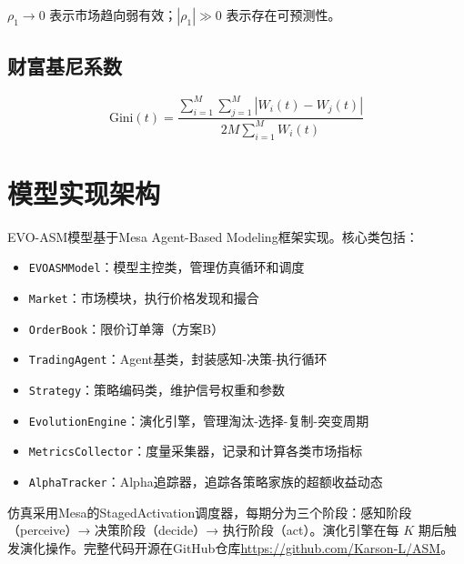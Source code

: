 $\rho_1 \to 0$ 表示市场趋向弱有效；$|\rho_1| \gg 0$ 表示存在可预测性。

\subsection{财富基尼系数}

\begin{equation}
\text{Gini}(t) = \frac{\sum_{i=1}^{M} \sum_{j=1}^{M} |W_i(t) - W_j(t)|}{2M \sum_{i=1}^{M} W_i(t)}
\label{eq:gini}
\end{equation}

\section{模型实现架构}

EVO-ASM模型基于Mesa Agent-Based Modeling框架实现。核心类包括：

\begin{itemize}
    \item \texttt{EVOASMModel}：模型主控类，管理仿真循环和调度
    \item \texttt{Market}：市场模块，执行价格发现和撮合
    \item \texttt{OrderBook}：限价订单簿（方案B）
    \item \texttt{TradingAgent}：Agent基类，封装感知-决策-执行循环
    \item \texttt{Strategy}：策略编码类，维护信号权重和参数
    \item \texttt{EvolutionEngine}：演化引擎，管理淘汰-选择-复制-突变周期
    \item \texttt{MetricsCollector}：度量采集器，记录和计算各类市场指标
    \item \texttt{AlphaTracker}：Alpha追踪器，追踪各策略家族的超额收益动态
\end{itemize}

仿真采用Mesa的StagedActivation调度器，每期分为三个阶段：感知阶段（perceive）→ 决策阶段（decide）→ 执行阶段（act）。演化引擎在每 $K$ 期后触发演化操作。完整代码开源在GitHub仓库\url{https://github.com/Karson-L/ASM}。
